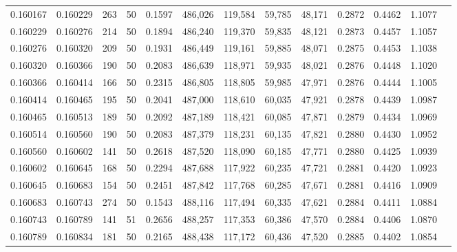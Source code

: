 \begin{tabular}{rrrrrrrrrrrrr}
0.160167 & 0.160229 &   263 &  50 &                                     0.1597 & 486,026 & 119,584 &  59,785 &  48,171 & 0.2872 & 0.4462 & 1.1077 \\
0.160229 & 0.160276 &   214 &  50 &                                     0.1894 & 486,240 & 119,370 &  59,835 &  48,121 & 0.2873 & 0.4457 & 1.1057 \\
0.160276 & 0.160320 &   209 &  50 &                                     0.1931 & 486,449 & 119,161 &  59,885 &  48,071 & 0.2875 & 0.4453 & 1.1038 \\
0.160320 & 0.160366 &   190 &  50 &                                     0.2083 & 486,639 & 118,971 &  59,935 &  48,021 & 0.2876 & 0.4448 & 1.1020 \\
0.160366 & 0.160414 &   166 &  50 &                                     0.2315 & 486,805 & 118,805 &  59,985 &  47,971 & 0.2876 & 0.4444 & 1.1005 \\
0.160414 & 0.160465 &   195 &  50 &                                     0.2041 & 487,000 & 118,610 &  60,035 &  47,921 & 0.2878 & 0.4439 & 1.0987 \\
0.160465 & 0.160513 &   189 &  50 &                                     0.2092 & 487,189 & 118,421 &  60,085 &  47,871 & 0.2879 & 0.4434 & 1.0969 \\
0.160514 & 0.160560 &   190 &  50 &                                     0.2083 & 487,379 & 118,231 &  60,135 &  47,821 & 0.2880 & 0.4430 & 1.0952 \\
0.160560 & 0.160602 &   141 &  50 &                                     0.2618 & 487,520 & 118,090 &  60,185 &  47,771 & 0.2880 & 0.4425 & 1.0939 \\
0.160602 & 0.160645 &   168 &  50 &                                     0.2294 & 487,688 & 117,922 &  60,235 &  47,721 & 0.2881 & 0.4420 & 1.0923 \\
0.160645 & 0.160683 &   154 &  50 &                                     0.2451 & 487,842 & 117,768 &  60,285 &  47,671 & 0.2881 & 0.4416 & 1.0909 \\
0.160683 & 0.160743 &   274 &  50 &                                     0.1543 & 488,116 & 117,494 &  60,335 &  47,621 & 0.2884 & 0.4411 & 1.0884 \\
0.160743 & 0.160789 &   141 &  51 &                                     0.2656 & 488,257 & 117,353 &  60,386 &  47,570 & 0.2884 & 0.4406 & 1.0870 \\
0.160789 & 0.160834 &   181 &  50 &                                     0.2165 & 488,438 & 117,172 &  60,436 &  47,520 & 0.2885 & 0.4402 & 1.0854 \\

\end{tabular}
